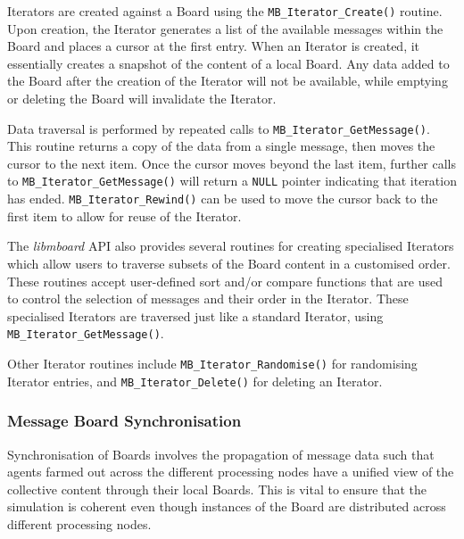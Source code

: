 Iterators are created against a Board using the \texttt{MB\_Iterator\_Create()} routine. Upon creation, the Iterator generates a list of the available messages within the Board and places a cursor at the first entry. When an Iterator is created, it essentially creates a snapshot of the content of a local Board. Any data added to the Board after the creation of the Iterator will not be available, while emptying or deleting the Board will invalidate the Iterator.

Data traversal is performed by repeated calls to \texttt{MB\_Iterator\_GetMessage()}. This routine returns a copy of the data from a single message, then moves the cursor to the next item. Once the cursor moves beyond the last item, further calls to \texttt{MB\_Iterator\_GetMessage()} will return a \texttt{NULL} pointer indicating that iteration has ended. \texttt{MB\_Iterator\_Rewind()} can be used to move the cursor back to the first item to allow for reuse of the Iterator.

The \textit{libmboard} API also provides several routines for creating specialised Iterators which allow users to traverse subsets of the Board content in a customised order. These routines accept user-defined sort and/or compare functions that are used to control the selection of messages and their order in the Iterator. These specialised Iterators are traversed just like a standard Iterator, using \texttt{MB\_Iterator\_GetMessage()}.

Other Iterator routines include \texttt{MB\_Iterator\_Randomise()} for randomising Iterator entries, and \texttt{MB\_Iterator\_Delete()} for deleting an Iterator.


\subsubsection{Message Board Synchronisation}
\label{sec:mb_sync}

Synchronisation of Boards involves the propagation of message data such that agents farmed out across the different processing nodes have a unified view of the collective content through their local Boards. This is vital to ensure that the simulation is coherent even though instances of the Board are distributed across different processing nodes.

